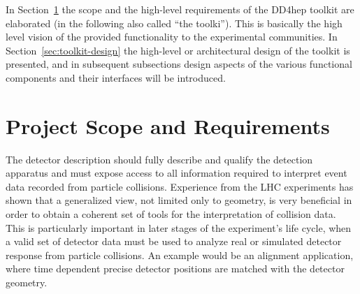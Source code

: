 In Section~\ref{sec:architectural-concepts} the scope and the high-level requirements of the DD4hep toolkit are elaborated (in the following also called ``the toolki''). This is basically the high level vision 
of the provided functionality to the experimental communities. In Section~\ref{sec:toolkit-design} the high-level or architectural design of the toolkit is presented, and in subsequent subsections design aspects of the various functional components and their interfaces will be introduced.

\section{Project Scope and Requirements}
\label{sec:architectural-concepts}

The detector description should fully describe and qualify the detection apparatus and must expose access to all information required to interpret event data recorded from particle collisions. Experience from the LHC experiments has shown that a generalized view, not limited only to geometry, is very beneficial in order to obtain a coherent set of tools for the interpretation of collision data. This is particularly important in later stages of the experiment's life cycle, when a valid set of detector data must be used to analyze real or simulated detector response from particle collisions. An example would be an alignment application, where time dependent precise detector positions are matched with the detector geometry.

